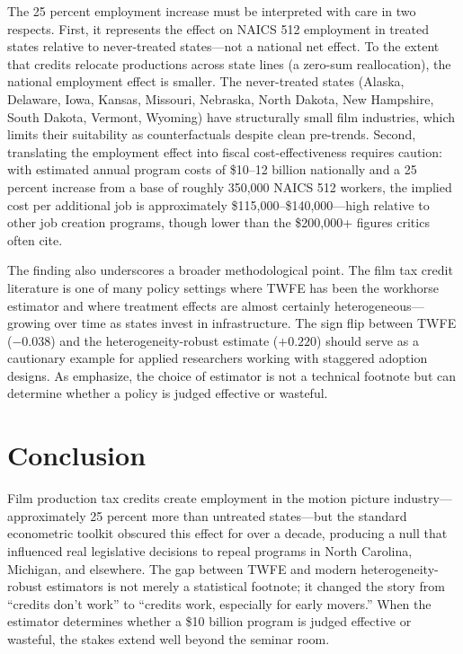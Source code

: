 \documentclass[12pt]{article}
\begin{document}
The 25 percent employment increase must be interpreted with care in two respects. First, it represents the effect on NAICS 512 employment in treated states relative to never-treated states---not a national net effect. To the extent that credits relocate productions across state lines (a zero-sum reallocation), the national employment effect is smaller. The never-treated states (Alaska, Delaware, Iowa, Kansas, Missouri, Nebraska, North Dakota, New Hampshire, South Dakota, Vermont, Wyoming) have structurally small film industries, which limits their suitability as counterfactuals despite clean pre-trends. Second, translating the employment effect into fiscal cost-effectiveness requires caution: with estimated annual program costs of \$10--12 billion nationally \citep{tannenwald2010state} and a 25 percent increase from a base of roughly 350,000 NAICS 512 workers, the implied cost per additional job is approximately \$115,000--\$140,000---high relative to other job creation programs, though lower than the \$200,000+ figures critics often cite.

The finding also underscores a broader methodological point. The film tax credit literature is one of many policy settings where TWFE has been the workhorse estimator and where treatment effects are almost certainly heterogeneous---growing over time as states invest in infrastructure. The sign flip between TWFE ($-0.038$) and the heterogeneity-robust estimate ($+0.220$) should serve as a cautionary example for applied researchers working with staggered adoption designs. As \citet{roth2023s} emphasize, the choice of estimator is not a technical footnote but can determine whether a policy is judged effective or wasteful.

\section{Conclusion}

Film production tax credits create employment in the motion picture industry---approximately 25 percent more than untreated states---but the standard econometric toolkit obscured this effect for over a decade, producing a null that influenced real legislative decisions to repeal programs in North Carolina, Michigan, and elsewhere. The gap between TWFE and modern heterogeneity-robust estimators is not merely a statistical footnote; it changed the story from ``credits don't work'' to ``credits work, especially for early movers.'' When the estimator determines whether a \$10 billion program is judged effective or wasteful, the stakes extend well beyond the seminar room.
\end{document}
